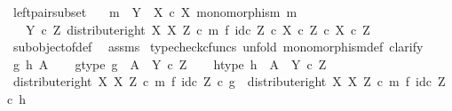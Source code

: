 \begin{isabellebody}
\ left{\isacharunderscore}{\kern0pt}pair{\isacharunderscore}{\kern0pt}subset{\isacharcolon}{\kern0pt}\isanewline
\ \ \ {\isachardoublequoteopen}m\ {\isacharcolon}{\kern0pt}\ Y\ {\isasymrightarrow}\ X\ {\isasymtimes}\isactrlsub c\ X{\isachardoublequoteclose}\ {\isachardoublequoteopen}monomorphism\ m{\isachardoublequoteclose}\isanewline
\ \ \ {\isachardoublequoteopen}{\isacharparenleft}{\kern0pt}Y\ {\isasymtimes}\isactrlsub c\ Z{\isacharcomma}{\kern0pt}\ distribute{\isacharunderscore}{\kern0pt}right\ X\ X\ Z\ {\isasymcirc}\isactrlsub c\ {\isacharparenleft}{\kern0pt}m\ {\isasymtimes}\isactrlsub f\ id\isactrlsub c\ Z{\isacharparenright}{\kern0pt}{\isacharparenright}{\kern0pt}\ {\isasymsubseteq}\isactrlsub c\ {\isacharparenleft}{\kern0pt}X\ {\isasymtimes}\isactrlsub c\ Z{\isacharparenright}{\kern0pt}\ {\isasymtimes}\isactrlsub c\ {\isacharparenleft}{\kern0pt}X\ {\isasymtimes}\isactrlsub c\ Z{\isacharparenright}{\kern0pt}{\isachardoublequoteclose}\isanewline
%
\isadelimproof
\ \ %
\endisadelimproof
%
\isatagproof
{}\isamarkupfalse%
\ subobject{\isacharunderscore}{\kern0pt}of{\isacharunderscore}{\kern0pt}def{}\ \isamarkupfalse%
\ assms\isanewline
{}\isamarkupfalse%
\ {\isacharparenleft}{\kern0pt}typecheck{\isacharunderscore}{\kern0pt}cfuncs{\isacharcomma}{\kern0pt}\ unfold\ monomorphism{\isacharunderscore}{\kern0pt}def{}{\isacharcomma}{\kern0pt}\ clarify{\isacharparenright}{\kern0pt}\isanewline
\ \ \isamarkupfalse%
\ g\ h\ A\isanewline
\ \ \isamarkupfalse%
\ g{\isacharunderscore}{\kern0pt}type{\isacharcolon}{\kern0pt}\ {\isachardoublequoteopen}g\ {\isacharcolon}{\kern0pt}\ A\ {\isasymrightarrow}\ Y\ {\isasymtimes}\isactrlsub c\ Z{\isachardoublequoteclose}\isanewline
\ \ \isamarkupfalse%
\ h{\isacharunderscore}{\kern0pt}type{\isacharcolon}{\kern0pt}\ {\isachardoublequoteopen}h\ {\isacharcolon}{\kern0pt}\ A\ {\isasymrightarrow}\ Y\ {\isasymtimes}\isactrlsub c\ Z{\isachardoublequoteclose}\isanewline
\ \ \isamarkupfalse%
\ {\isachardoublequoteopen}{\isacharparenleft}{\kern0pt}distribute{\isacharunderscore}{\kern0pt}right\ X\ X\ Z\ {\isasymcirc}\isactrlsub c\ {\isacharparenleft}{\kern0pt}m\ {\isasymtimes}\isactrlsub f\ id\isactrlsub c\ Z{\isacharparenright}{\kern0pt}{\isacharparenright}{\kern0pt}\ {\isasymcirc}\isactrlsub c\ g\ {\isacharequal}{\kern0pt}\ {\isacharparenleft}{\kern0pt}distribute{\isacharunderscore}{\kern0pt}right\ X\ X\ Z\ {\isasymcirc}\isactrlsub c\ m\ {\isasymtimes}\isactrlsub f\ id\isactrlsub c\ Z{\isacharparenright}{\kern0pt}\ {\isasymcirc}\isactrlsub c\ h{\isachardoublequoteclose}\isanewline

\end{isabellebody}
